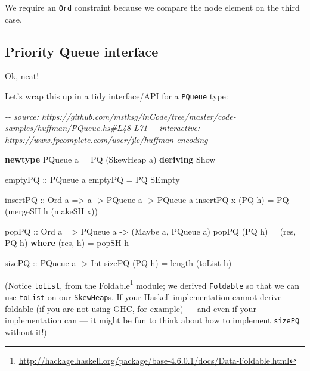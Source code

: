 \documentclass[]{article}
\newenvironment{Shaded}{}{}
\newcommand{\CommentTok}[1]{\textcolor[rgb]{0.38,0.63,0.69}{\textit{#1}}}
\newcommand{\DataTypeTok}[1]{\textcolor[rgb]{0.56,0.13,0.00}{#1}}
\newcommand{\FunctionTok}[1]{\textcolor[rgb]{0.02,0.16,0.49}{#1}}
\newcommand{\KeywordTok}[1]{\textcolor[rgb]{0.00,0.44,0.13}{\textbf{#1}}}
\newcommand{\NormalTok}[1]{#1}
\newcommand{\OtherTok}[1]{\textcolor[rgb]{0.00,0.44,0.13}{#1}}
\renewcommand{\href}[2]{#2\footnote{\url{#1}}}
\begin{document}
We require an \texttt{Ord} constraint because we compare the node element on the
third case.

\subsection{Priority Queue interface}\label{priority-queue-interface}

Ok, neat!

Let's wrap this up in a tidy interface/API for a \texttt{PQueue} type:

\begin{Shaded}
\begin{Highlighting}[]
\CommentTok{{-}{-} source: https://github.com/mstksg/inCode/tree/master/code{-}samples/huffman/PQueue.hs\#L48{-}L71}
\CommentTok{{-}{-} interactive: https://www.fpcomplete.com/user/jle/huffman{-}encoding}

\KeywordTok{newtype} \DataTypeTok{PQueue}\NormalTok{ a }\OtherTok{=} \DataTypeTok{PQ}\NormalTok{ (}\DataTypeTok{SkewHeap}\NormalTok{ a) }\KeywordTok{deriving} \DataTypeTok{Show}

\OtherTok{emptyPQ ::} \DataTypeTok{PQueue}\NormalTok{ a}
\NormalTok{emptyPQ }\OtherTok{=} \DataTypeTok{PQ} \DataTypeTok{SEmpty}

\OtherTok{insertPQ ::} \DataTypeTok{Ord}\NormalTok{ a }\OtherTok{=\textgreater{}}\NormalTok{ a }\OtherTok{{-}\textgreater{}} \DataTypeTok{PQueue}\NormalTok{ a }\OtherTok{{-}\textgreater{}} \DataTypeTok{PQueue}\NormalTok{ a}
\NormalTok{insertPQ x (}\DataTypeTok{PQ}\NormalTok{ h) }\OtherTok{=} \DataTypeTok{PQ}\NormalTok{ (mergeSH h (makeSH x))}

\OtherTok{popPQ ::} \DataTypeTok{Ord}\NormalTok{ a }\OtherTok{=\textgreater{}} \DataTypeTok{PQueue}\NormalTok{ a }\OtherTok{{-}\textgreater{}}\NormalTok{ (}\DataTypeTok{Maybe}\NormalTok{ a, }\DataTypeTok{PQueue}\NormalTok{ a)}
\NormalTok{popPQ (}\DataTypeTok{PQ}\NormalTok{ h) }\OtherTok{=}\NormalTok{ (res, }\DataTypeTok{PQ}\NormalTok{ h\textquotesingle{})}
  \KeywordTok{where}
\NormalTok{    (res, h\textquotesingle{}) }\OtherTok{=}\NormalTok{ popSH h}

\OtherTok{sizePQ ::} \DataTypeTok{PQueue}\NormalTok{ a }\OtherTok{{-}\textgreater{}} \DataTypeTok{Int}
\NormalTok{sizePQ (}\DataTypeTok{PQ}\NormalTok{ h) }\OtherTok{=} \FunctionTok{length}\NormalTok{ (toList h)}
\end{Highlighting}
\end{Shaded}

(Notice \texttt{toList}, from the
\href{http://hackage.haskell.org/package/base-4.6.0.1/docs/Data-Foldable.html}{Foldable}
module; we derived \texttt{Foldable} so that we can use \texttt{toList} on our
\texttt{SkewHeap}s. If your Haskell implementation cannot derive foldable (if
you are not using GHC, for example) --- and even if your implementation can ---
it might be fun to think about how to implement \texttt{sizePQ} without it!)
\end{document}
